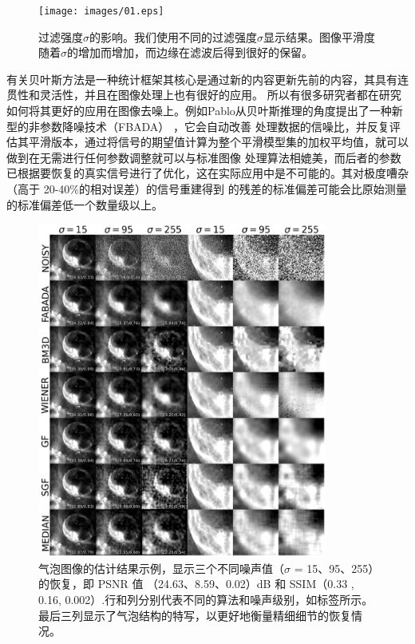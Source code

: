 \begin{figure}[htbp]
	\begin{center}
	    \vspace{10pt} %
		\texttt{[image: images/01.eps]}
		\caption{过滤强度$\sigma$的影响。我们使用不同的过滤强度$\sigma$显示结果。图像平滑度随着$\sigma$的增加而增加，而边缘在滤波后得到很好的保留。} 
		\label{01} %
	\end{center}
\end{figure}

有关贝叶斯方法是一种统计框架其核心是通过新的内容更新先前的内容，其具有连贯性和灵活性，并且在图像处理上也有很好的应用。
所以有很多研究者都在研究如何将其更好的应用在图像去噪上。例如Pablo从贝叶斯推理的角度提出了一种新型的非参数降噪技术（FBADA）
\cite{sanchez-alarconFullyAdaptiveBayesian2022}，它会自动改善
处理数据的信噪比，并反复评估其平滑版本，通过将信号的期望值计算为整个平滑模型集的加权平均值，就可以做到在无需进行任何参数调整就可以与标准图像
处理算法相媲美，而后者的参数已根据要恢复的真实信号进行了优化，这在实际应用中是不可能的。其对极度嘈杂（高于 20-40\%的相对误差）的信号重建得到
的残差的标准偏差可能会比原始测量的标准偏差低一个数量级以上。

\begin{figure}[htbp]
	\begin{center}
	    \vspace{10pt} %
		\includegraphics[width = 0.85\textwidth]{images/02.eps}
		\caption{气泡图像的估计结果示例，显示三个不同噪声值（$\sigma$ = 15、95、255）的恢复，即 PSNR 值
        （24.63、8.59、0.02）dB 和 SSIM（0.33 , 0.16, 0.002）.行和列分别代表不同的算法和噪声级别，如标签所示。最后三列显示了气泡结构的特写，以更好地衡量精细细节的恢复情况。} 
		\label{02} %
	\end{center}
\end{figure}

